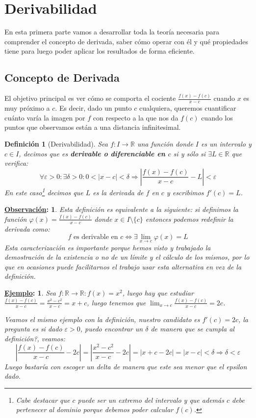 \documentclass[10pt,a4paper,openright]{book}
\theoremstyle{break}
\newtheorem*{defi}{Definición}
\newtheorem*{obs}{\underline{Observación}:}
\newtheorem*{ej}{\underline{Ejemplo}:}
\begin{document}
\section{Derivabilidad}
En esta primera parte vamos a desarrollar toda la teoría necesaria para comprender el concepto de derivada, saber cómo operar con él y qué propiedades tiene para luego poder aplicar los resultados de forma eficiente.

\subsection{Concepto de Derivada}
El objetivo principal es ver cómo se comporta el cociente $\frac{f(x) - f(c)}{x-c}$ cuando $x$ es muy próximo a $c$. Es decir, dado un punto $c$ cualquiera, queremos cuantificar cuánto varía la imagen por $f$ con respecto a la que nos da $f(c)$ cuando los puntos que observamos están a una distancia infinitesimal.

\begin{defi}[Derivabilidad]
Sea $f: I\rightarrow \mathbb R$ una función donde $I$ es un intervalo y $c\in I$, decimos que es \textbf{derivable o diferenciable en $c$} si y sólo si $\exists L\in \mathbb R$ que verifica:
$$\forall \varepsilon>0: \exists \delta>0 : 0<|x-c|<\delta\Rightarrow \left|\frac{f(x)-f(c)}{x-c}-L\right|<\varepsilon$$
En este caso\footnote{Cabe destacar que $c$ puede ser un extremo del intervalo y que además $c$ debe pertenecer al dominio porque debemos poder calcular $f(c)$.} decimos que $L$ es la derivada de $f$ en $c$ y escribimos $f'(c)=L$.
\end{defi}

\begin{obs}
Esta definición es equivalente a la siguiente: si definimos la función $\varphi(x) = \frac{f(x)-f(c)}{x-c}$ donde $x\in I\mbox{\textbackslash}\{c\}$ entonces podemos redefinir la derivada como:
$$f\mbox{ es derivable en }c\Leftrightarrow \exists \lim_{x\rightarrow c}\varphi(x) = L$$
Esta caracterización es importante porque hemos visto y trabajado la demostración de la existencia o no de un límite y el cálculo de los mismos, por lo que en ocasiones puede facilitarnos el trabajo usar esta alternativa en vez de la definición.
\end{obs}

\begin{ej}
Sea $f: \mathbb R \rightarrow \mathbb R: f(x)=x^2$, luego hay que estudiar $\frac{f(x)-f(c)}{x-c} = \frac{x^2- c^2}{x-c}= x+c$, luego tenemos que $\lim_{x\rightarrow c} \frac{f(x)-f(c)}{x-c}= 2c$.\par
Veamos el mismo ejemplo con la definición, nuestro candidato es $f'(c)=2c$, la pregunta es si dado $\varepsilon>0$, puedo encontrar un $\delta$ de manera que se cumpla al definición?, veamos:
$$\left|\frac{f(x)-f(c)}{x-c}-2c\right| = \left|\frac{x^2-c^2}{x-c}-2c\right| = |x+c-2c|= |x-c|<\delta \Rightarrow \delta <\varepsilon$$
Luego bastaría con escoger un delta de manera que este sea menor que el epsilon dado.
\end{ej}
\end{document}
